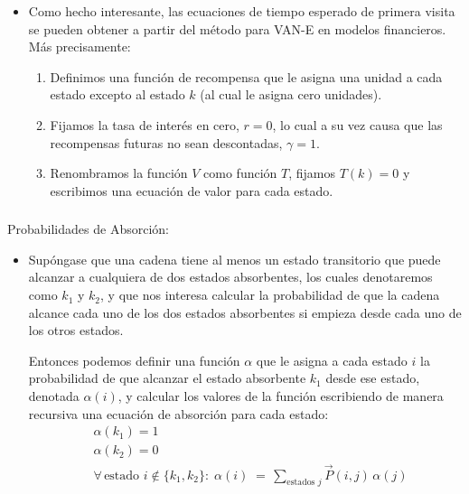 \documentclass[ 10pt, xcolor = dvipsnames]{beamer}
\begin{document}
\begin{frame}[allowframebreaks]
\begin{itemize}
\item Como hecho interesante, las ecuaciones de tiempo esperado de primera visita se pueden obtener a partir del m\'etodo para VAN-E en modelos financieros. M\'as precisamente: 
\begin{enumerate}
\item Definimos una funci\'on de recompensa que le asigna una unidad a cada estado excepto al estado $k$ (al cual le asigna cero unidades). 
\item Fijamos la tasa de inter\'es en cero, \ie $r = 0$, lo cual a su vez causa que las recompensas futuras no sean descontadas, \ie $\gamma = 1$. 
\item Renombramos la funci\'on $V$ como funci\'on $T$, fijamos $T(k) = 0$ y escribimos una ecuaci\'on de valor para cada estado. 
\end{enumerate}

\end{itemize}

\end{frame}

\begin{frame}[allowframebreaks]
\frametitle{\insertsubsection}

Probabilidades de Absorci\'on: 
\begin{itemize}
\item Sup\'ongase que una cadena tiene al menos un estado transitorio que puede alcanzar a cualquiera de dos estados absorbentes, los cuales denotaremos como $k_1$ y $k_2$, y que nos interesa calcular la probabilidad de que la cadena alcance cada uno de los dos estados absorbentes si empieza desde cada uno de los otros estados. 

Entonces podemos definir una funci\'on $\alpha$ que le asigna a cada estado $i$ la probabilidad de que alcanzar el estado absorbente $k_1$ desde ese estado, denotada $\alpha(i)$, y calcular los valores de la funci\'on escribiendo de manera recursiva una ecuaci\'on de absorci\'on para cada estado: 
\begin{align*}
& \alpha(k_1) = 1 \\
& \alpha(k_2) = 0 \\
& \forall \, \text{estado } i \notin \{ k_1, k_2 \}
\colon \; \alpha(i) \; = \,
\sum_{\text{estados }j} \vec{P}(i,j) \, \alpha(j)
\end{align*}


\end{itemize}

\end{frame}
\end{document}
